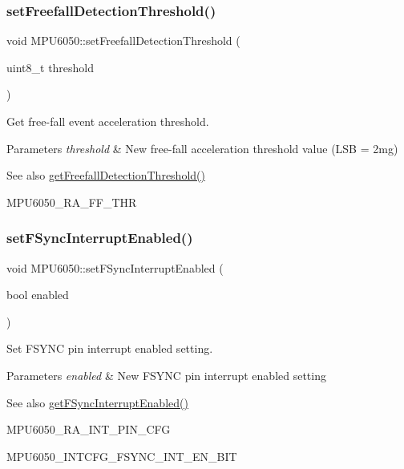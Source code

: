 \subsubsection{\texorpdfstring{setFreefallDetectionThreshold()}{setFreefallDetectionThreshold()}}
{\footnotesize\ttfamily void M\+P\+U6050\+::set\+Freefall\+Detection\+Threshold (\begin{DoxyParamCaption}\item[{uint8\+\_\+t}]{threshold }\end{DoxyParamCaption})}

Get free-\/fall event acceleration threshold. 
\begin{DoxyParams}{Parameters}
{\em threshold} & New free-\/fall acceleration threshold value (L\+SB = 2mg) \\
\hline
\end{DoxyParams}
\begin{DoxySeeAlso}{See also}
\mbox{\hyperlink{class_m_p_u6050_ac7f5c0511fe9d0f3525a3757498daed7}{get\+Freefall\+Detection\+Threshold()}} 

M\+P\+U6050\+\_\+\+R\+A\+\_\+\+F\+F\+\_\+\+T\+HR 
\end{DoxySeeAlso}
\mbox{\label{class_m_p_u6050_a96aa409e02cdb7d3671890c70b44f167}} 
\subsubsection{\texorpdfstring{setFSyncInterruptEnabled()}{setFSyncInterruptEnabled()}}
{\footnotesize\ttfamily void M\+P\+U6050\+::set\+F\+Sync\+Interrupt\+Enabled (\begin{DoxyParamCaption}\item[{bool}]{enabled }\end{DoxyParamCaption})}

Set F\+S\+Y\+NC pin interrupt enabled setting. 
\begin{DoxyParams}{Parameters}
{\em enabled} & New F\+S\+Y\+NC pin interrupt enabled setting \\
\hline
\end{DoxyParams}
\begin{DoxySeeAlso}{See also}
\mbox{\hyperlink{class_m_p_u6050_a4c01f9ab83b64dbbc6b62e658c3d3d9b}{get\+F\+Sync\+Interrupt\+Enabled()}} 

M\+P\+U6050\+\_\+\+R\+A\+\_\+\+I\+N\+T\+\_\+\+P\+I\+N\+\_\+\+C\+FG 

M\+P\+U6050\+\_\+\+I\+N\+T\+C\+F\+G\+\_\+\+F\+S\+Y\+N\+C\+\_\+\+I\+N\+T\+\_\+\+E\+N\+\_\+\+B\+IT 
\end{DoxySeeAlso}
\mbox{\label{class_m_p_u6050_a2b1c75cfc29e8ff8205f4ff33a426716}} 
